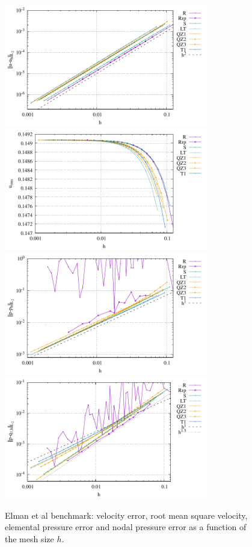 \documentclass[a4paper,12pt]{article}
\begin{document}
\begin{figure}
\centering
\includegraphics[width=8.9cm]{../results/errors_u_exp7}
\includegraphics[width=8.9cm]{../results/vrms_exp7} \\
\includegraphics[width=8.9cm]{../results/errors_p_exp7}
\includegraphics[width=8.9cm]{../results/errors_q1_exp7}
\caption{Elman et al benchmark: velocity error, 
root mean square velocity, elemental pressure error and nodal pressure error
as a function of the mesh size $h$.}
\label{fig:resexp7}
\end{figure}
\end{document}
